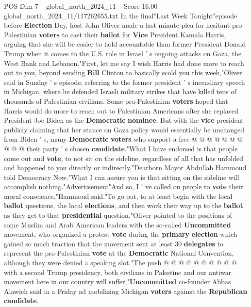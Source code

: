 \begin{textsample}{POS Dim 7 – global\_north\_2024\_11 – Score 16.00 – global\_north\_2024\_11/117262655.txt}  \label{ex:f7_pos_111}
In the final"Last Week Tonight"episode before \textbf{Election} Day, host John Oliver made a last-minute plea for hesitant pro-Palestinian \textbf{voters} to cast their \textbf{ballot} for \textbf{Vice} President Kamala Harris, arguing that she will be easier to hold accountable than former President Donald Trump when it comes to the U.S. role in Israel ' s ongoing attacks on Gaza, the West Bank and Lebanon."First, let me say I wish Harris had done more to reach out to you, beyond sending \textbf{Bill} Clinton to basically scold you this week,"Oliver said in Sunday ' s episode, referring to the former president ' s incendiary speech in Michigan, where he defended Israeli military strikes that have killed tens of thousands of Palestinian civilians.
Some pro-Palestinian \textbf{voters} hoped that Harris would do more to reach out to Palestinian Americans after she replaced President Joe Biden as the \textbf{Democratic} \textbf{nominee}.
But with the \textbf{vice} president publicly claiming that her stance on Gaza policy would essentially be unchanged from Biden ' s, many \textbf{Democratic} \textbf{voters} who support a free @ @ @ @ @ @ @ @ @ @ their party ' s chosen \textbf{candidate}."What I have endorsed is that people come out and \textbf{vote}, to not sit on the sideline, regardless of all that has unfolded and happened to you directly or indirectly,"Dearborn Mayor Abdullah Hammoud told Democracy Now."What I can assure you is that sitting on the sideline will accomplish nothing."Advertisement"And so, I ' ve called on people to \textbf{vote} their moral conscience,"Hammoud said."To go out, to at least begin with the local \textbf{ballot} questions, the local \textbf{elections}, and then work their way up to the \textbf{ballot} as they get to that \textbf{presidential} question."Oliver pointed to the positions of some Muslim and Arab American leaders with the so-called \textbf{Uncommitted} movement, who organized a protest \textbf{vote} during the \textbf{primary} \textbf{election} which gained so much traction that the movement sent at least 30 \textbf{delegates} to represent the pro-Palestinian \textbf{vote} at the \textbf{Democratic} National Convention, although they were denied a speaking slot."The push @ @ @ @ @ @ @ @ @ @ with a second Trump presidency, both civilians in Palestine and our antiwar movement here in our country will suffer,"\textbf{Uncommitted} co-founder Abbas Alawieh said in a Friday ad mobilizing Michigan \textbf{voters} against the \textbf{Republican} \textbf{candidate}.

\end{textsample}
